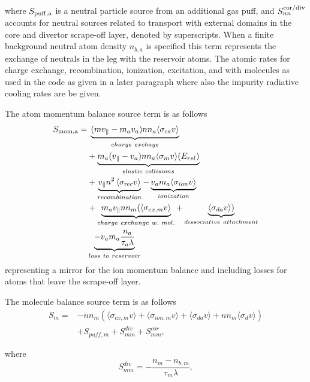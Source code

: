 \documentclass[amsmath,amssymb,a4]{revtex4-2}
\begin{document}
where $S_{\rm puff,a}$ is a neutral particle source from an additional gas puff, and $S^{\rm cor/div}_{nn}$ accounts for neutral sources related to transport with external domains in the core and divertor scrape-off layer, denoted by superscripts. When a finite background neutral atom density $n_{b,a}$ is specified this term represents the exchange of neutrals in the leg with the reservoir atoms. The atomic rates for charge exchange, recombination, ionization, excitation, and with molecules as used in the code as given in a later paragraph where also the impurity radiative cooling rates are be given.

\noindent The atom momentum balance source term is as follows
\begin{equation}
\begin{aligned}
     S_{\rm mom,a} = & \; \underbrace{(mv_\parallel-m_av_a)n n_a \langle\sigma_{\rm{cx}}v\rangle }_{charge~ exchage} \\
     &+\underbrace{m_a(v_\parallel-v_a)nn_a\langle\sigma_m v\rangle(E_{rel})}_{elastic~ collisions} \\
     &+\underbrace{v_\parallel n^2\left\langle\sigma_{\mathrm{rec}} v\right\rangle}_{recombination} -\underbrace{v_am_a\langle \sigma_{ion}v\rangle}_{ionization}  \\
     & +  \underbrace{m_a v_\parallel nn_m(\langle\sigma_{cx,m} v \rangle }_{charge ~exchange ~w.~ mol.}  + \underbrace{\langle\sigma_{da} v \rangle)}_{dissociative~ attachment} \\
     &\underbrace{-v_am_a\frac{n_a}{\tau_a\lambda}}_{loss~to~reservoir} \\
\end{aligned}
\label{eq:S_mom,a}
\end{equation}
representing a mirror for the ion momentum balance and including losses for atoms that leave the scrape-off layer.
\noindent 

\noindent The molecule balance source term is as follows
\begin{equation}
    \begin{aligned}
    S_m =& -nn_m\left(\langle\sigma_{cx,m} v\rangle + \langle\sigma_{ion,m} v\rangle + \langle\sigma_{da} v\rangle + nn_m\langle\sigma_{d} v\rangle \right) \\
    &+ S_{puff,m}+S^{div}_{mm}+S^{cor}_{mm},
    \end{aligned}
\end{equation}

where 
\begin{equation}
    S_{mm}^{div} = - \frac{n_m-n_{b,m}}{\tau_m\lambda},
\end{equation}
\end{document}
